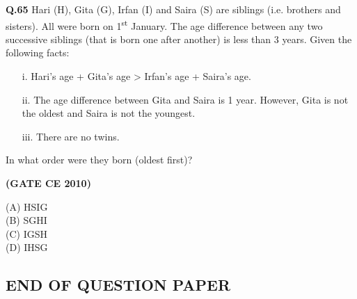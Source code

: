 \documentclass[journal,12pt,onecolumn]{exam}
\theoremstyle{remark}
\begin{document}
\begin{flushleft}
\setlength{\parskip}{0.5cm}

\noindent\textbf{Q.65} Hari (H), Gita (G), Irfan (I) and Saira (S) are siblings (i.e. brothers and sisters). All were born on 1\textsuperscript{st} January. The age difference between any two successive siblings (that is born one after another) is less than 3 years. Given the following facts:

\begin{itemize}
  \item[i.] Hari’s age + Gita’s age > Irfan’s age + Saira’s age.
  \item[ii.] The age difference between Gita and Saira is 1 year. However, Gita is not the oldest and Saira is not the youngest.
  \item[iii.] There are no twins.
\end{itemize}

\noindent In what order were they born (oldest first)?

\hfill\textbf{(GATE CE 2010)}

\begin{multicols}{2}
\noindent(A) HSIG\\
(B) SGHI\\
(C) IGSH\\
(D) IHSG
\end{multicols}

\end{flushleft}
\begin{center}
\section*{END OF QUESTION PAPER}
\end{center}
\end{document}
